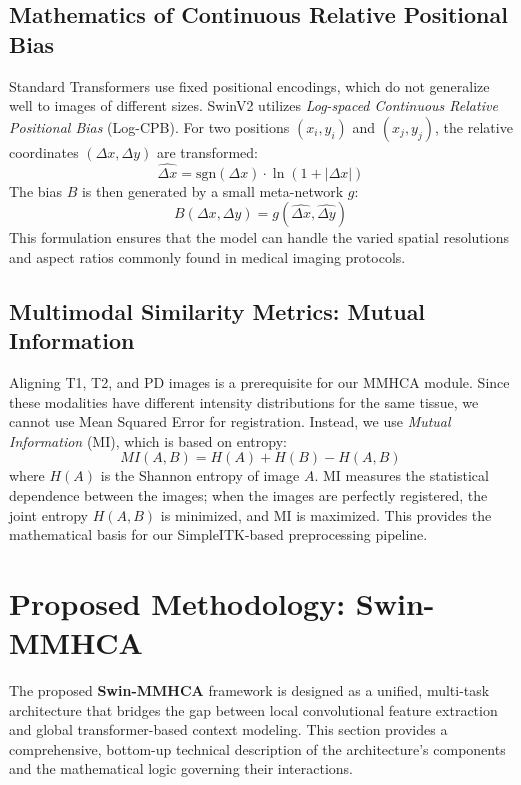 \documentclass{IEEEoj}
\begin{document}
\subsection{Mathematics of Continuous Relative Positional Bias}
Standard Transformers use fixed positional encodings, which do not generalize well to images of different sizes. SwinV2 utilizes \textit{Log-spaced Continuous Relative Positional Bias} (Log-CPB). For two positions $(x_i, y_i)$ and $(x_j, y_j)$, the relative coordinates $(\Delta x, \Delta y)$ are transformed:
\begin{equation}
    \widehat{\Delta x} = \text{sgn}(\Delta x) \cdot \ln(1 + |\Delta x|)
\end{equation}
The bias $B$ is then generated by a small meta-network $g$:
\begin{equation}
    B(\Delta x, \Delta y) = g(\widehat{\Delta x}, \widehat{\Delta y})
\end{equation}
This formulation ensures that the model can handle the varied spatial resolutions and aspect ratios commonly found in medical imaging protocols.

\subsection{Multimodal Similarity Metrics: Mutual Information}
Aligning T1, T2, and PD images is a prerequisite for our MMHCA module. Since these modalities have different intensity distributions for the same tissue, we cannot use Mean Squared Error for registration. Instead, we use \textit{Mutual Information} (MI), which is based on entropy:
\begin{equation}
    MI(A, B) = H(A) + H(B) - H(A, B)
\end{equation}
where $H(A)$ is the Shannon entropy of image $A$. MI measures the statistical dependence between the images; when the images are perfectly registered, the joint entropy $H(A, B)$ is minimized, and MI is maximized. This provides the mathematical basis for our SimpleITK-based preprocessing pipeline.

\section{Proposed Methodology: Swin-MMHCA}
The proposed \textbf{Swin-MMHCA} framework is designed as a unified, multi-task architecture that bridges the gap between local convolutional feature extraction and global transformer-based context modeling. This section provides a comprehensive, bottom-up technical description of the architecture's components and the mathematical logic governing their interactions.
\end{document}

